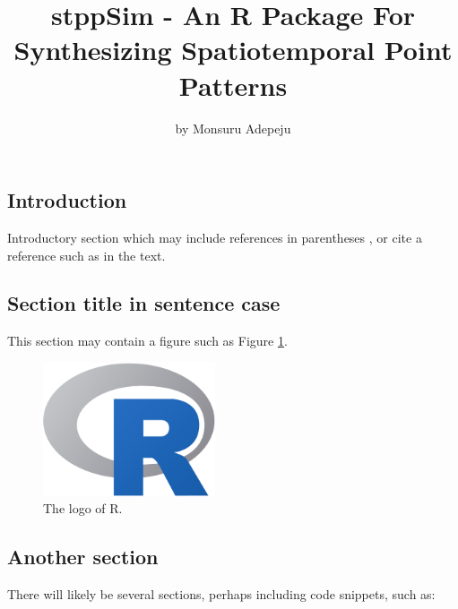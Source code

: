 \title{stppSim - An R Package For Synthesizing Spatiotemporal Point
Patterns}
\author{by Monsuru Adepeju}

\maketitle


\hypertarget{introduction}{%
\subsection{Introduction}\label{introduction}}

Introductory section which may include references in parentheses
\citep{R}, or cite a reference such as \citet{R} in the text.

\hypertarget{section-title-in-sentence-case}{%
\subsection{Section title in sentence
case}\label{section-title-in-sentence-case}}

This section may contain a figure such as Figure \ref{fig:Rlogo}.

\begin{Schunk}
\begin{figure}[htbp]

{\centering \includegraphics[width=2in]{Rlogo} 

}

\caption[The logo of R]{The logo of R.}\label{fig:Rlogo}
\end{figure}
\end{Schunk}

\hypertarget{another-section}{%
\subsection{Another section}\label{another-section}}

There will likely be several sections, perhaps including code snippets,
such as:

